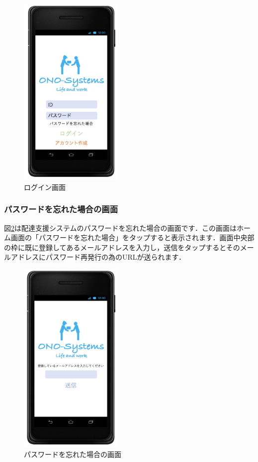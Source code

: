 \documentclass[a4j,titlepage]{jarticle}
\begin{document}
\begin{figure}[htbp]
 \begin{center}
  \includegraphics[width=50mm]{login.pdf}
	\caption{ログイン画面}
	\label{fig:login}
 \end{center}

\end{figure}


\subsubsection{パスワードを忘れた場合の画面}
図\ref{fig:ps_lost}は配達支援システムのパスワードを忘れた場合の画面です．この画面はホーム画面の「パスワードを忘れた場合」をタップすると表示されます．画面中央部の枠に既に登録してあるメールアドレスを入力し，送信をタップするとそのメールアドレスにパスワード再発行の為のURLが送られます．

\begin{figure}[htbp]
 \begin{center}
  \includegraphics[width=50mm]{ps_lost.pdf}
	\caption{パスワードを忘れた場合の画面}
	\label{fig:ps_lost}
 \end{center}

\end{figure}
\end{document}
